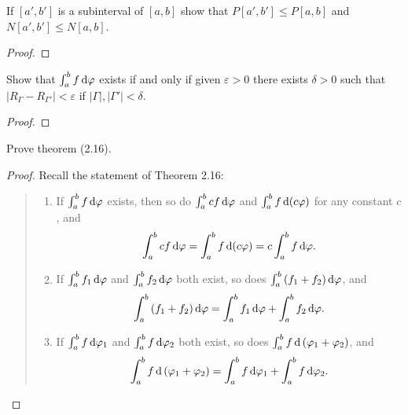 \begin{problem}
If $[a',b']$ is a subinterval of $[a,b]$ show that $P[a',b']\leq P[a,b]$
and $N[a',b']\leq N[a,b]$.
\end{problem}
\begin{proof}
\end{proof}
\begin{problem}
Show that $\int_a^bf\mathop{}\!\mathrm{d}\varphi$ exists if and only if given $\varepsilon>0$
there exists $\delta>0$ such that
$\left|R_\Gamma-R_{\Gamma'}\right|<\varepsilon$ if
$|\Gamma|,|\Gamma'|<\delta$.
\end{problem}
\begin{proof}
\end{proof}

\begin{problem}
Prove theorem (2.16).
\end{problem}
\begin{proof}
Recall the statement of Theorem 2.16:
\begin{quote}
\begin{enumerate}[label=(\roman*),noitemsep]
\item If $\int_a^b f\mathop{}\!\mathrm{d}\varphi$ exists, then so do $\int_a^bcf\mathop{}\!\mathrm{d}\varphi$ and
  $\int_a^b f\mathop{}\!\mathrm{d}(c\varphi)$ for any constant $c$, and
\[
\int_a^bcf\mathop{}\!\mathrm{d}\varphi=\int_a^bf\mathop{}\!\mathrm{d}(c\varphi)=c\int_a^bf\mathop{}\!\mathrm{d}\varphi.
\]
\item If $\int_a^b f_1\mathop{}\!\mathrm{d}\varphi$ and $\int_a^bf_2\mathop{}\!\mathrm{d}\varphi$ both exist, so
  does $\int_a^b\left(f_1+f_2\right)\mathop{}\!\mathrm{d}\varphi$, and
\[
\int_a^b\left(f_1+f_2\right)\mathop{}\!\mathrm{d}\varphi=\int_a^bf_1\mathop{}\!\mathrm{d}\varphi+\int_a^bf_2\mathop{}\!\mathrm{d}\varphi.
\]
\item If $\int_a^bf\mathop{}\!\mathrm{d}\varphi_1$ and $\int_a^bf\mathop{}\!\mathrm{d}\varphi_2$ both exist, so
  does $\int_a^bf\mathop{}\!\mathrm{d}\left(\varphi_1+\varphi_2\right)$, and
\[
\int_a^bf\mathop{}\!\mathrm{d}\left(\varphi_1+\varphi_2\right)=\int_a^bf\mathop{}\!\mathrm{d}\varphi_1+\int_a^bf\mathop{}\!\mathrm{d}\varphi_2.
\]
\end{enumerate}
\end{quote}
\end{proof}

